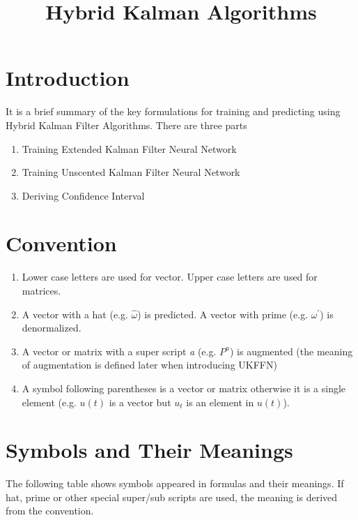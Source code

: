 \documentclass[letterpaper]{article}
\title{Hybrid Kalman Algorithms}
\begin{document}
\maketitle

\section*{Introduction}
It is a brief summary of the key formulations for training and predicting using Hybrid Kalman Filter Algorithms. There are three parts
\begin{enumerate}
  \item Training Extended Kalman Filter Neural Network
  \item Training Unscented Kalman Filter Neural Network
  \item Deriving Confidence Interval
\end{enumerate}

\section*{Convention}
\begin{enumerate}
  \item 
    Lower case letters are used for vector. Upper case letters are used for matrices.
  \item
    A vector with a hat (e.g. $\hat{\omega}$) is predicted. A vector with prime (e.g. $\omega^\prime$) is denormalized.
  \item
    A vector or matrix with a super script \emph{a} (e.g. $P^a$) is augmented (the meaning of augmentation is defined later when introducing UKFFN)
  \item
    A symbol following parentheses is a vector or matrix otherwise it is a single element (e.g. $u(t)$ is a vector but $u_t$ is an element in $u(t)$).
\end{enumerate}

\section*{Symbols and Their Meanings}
The following table shows symbols appeared in formulas and their meanings. If hat, prime or other special super/sub scripts are used, the meaning is derived from the convention.
\end{document}
